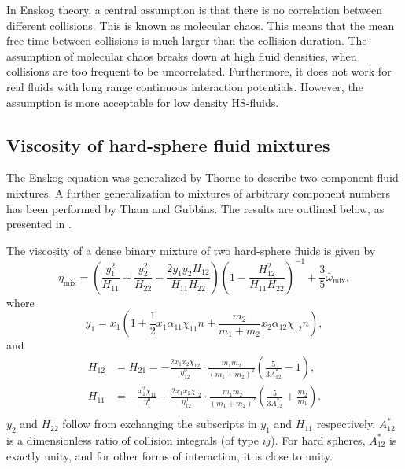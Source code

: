 
In Enskog theory, a central assumption is that there is no correlation between different collisions. 
This is known as molecular chaos.
This means that the mean free time between collisions is much larger than the collision duration. 
The assumption of molecular chaos breaks down at high fluid densities, when collisions are too frequent to be uncorrelated.
Furthermore, it does not work for real fluids with long range continuous interaction potentials.
However, the assumption is more acceptable for low density HS-fluids. 


\subsection{Viscosity of hard-sphere fluid mixtures}
The Enskog equation was generalized by Thorne to describe 
two-component fluid mixtures\cite{ref:chapman:non_uniform_gases}.
A further generalization to mixtures of arbitrary component numbers 
has been performed by Tham and Gubbins\cite{ref:tham:fluid_mixtures}.
The results are outlined below, 
as presented in \cite{ref:pippo:composition_dependence}.

The viscosity of a dense binary mixture of two hard-sphere fluids is given by
\begin{equation}
    \eta_{\text{mix}} 
        = \left(
            \frac{y_1^2}{H_{11}} 
            + \frac{y_2^2}{H_{22}} 
            - \frac{2 y_1 y_2 H_{12}}{H_{11} H_{22}}
        \right)
        \left(
            1 - \frac{H_{12}^2}{H_{11} H_{22}}
        \right)^{-1}
        + \frac{3}{5} \bar{\omega}_{\text{mix}},
\end{equation}
where
\begin{equation}
    \label{eq:viscosity_binary}
    y_1 
        = x_1 \left(
            1   + \frac{1}{2} x_1 \alpha_{11} \chi_{11} n 
                + \frac{m_2}{m_1 + m_2} x_2 \alpha_{12} \chi_{12} n
        \right), 
\end{equation}
and
\begin{equation}
    \begin{split}
        H_{12} &= H_{21}
                =   -\frac{2 x_1 x_2 \chi_{12}}{\eta^0_{12}}
                    \cdot \frac{m_1 m_2}{(m_1 + m_2)^2}
                    \left( \frac{5}{3A^*_{12}} - 1 \right), \\
        H_{11}
                &=  -\frac{x_1^2 \chi_{11}}{\eta^0_1}
                    +\frac{2 x_1 x_2 \chi_{12}}{\eta^0_{12}}
                    \cdot \frac{m_1 m_2}{(m_1 + m_2)^2}
                    \left( \frac{5}{3A^*_{12}} + \frac{m_2}{m_1} \right). \\
    \end{split}
\end{equation}
$y_2$ and $H_{22}$ follow from exchanging the subscripts in $y_1$ and $H_{11}$ 
respectively.
$A^*_{12}$ is a dimensionless ratio of collision integrals (of type ${ij}$).
For hard spheres, $A^*_{12}$ is exactly unity, 
and for other forms of interaction, it is close to unity.

